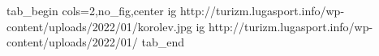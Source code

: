  
 
 
 
 

\ifcmt
  tab_begin cols=2,no_fig,center
  	ig http://turizm.lugasport.info/wp-content/uploads/2022/01/korolev.jpg
		ig http://turizm.lugasport.info/wp-content/uploads/2022/01/%
	tab_end
\fi
